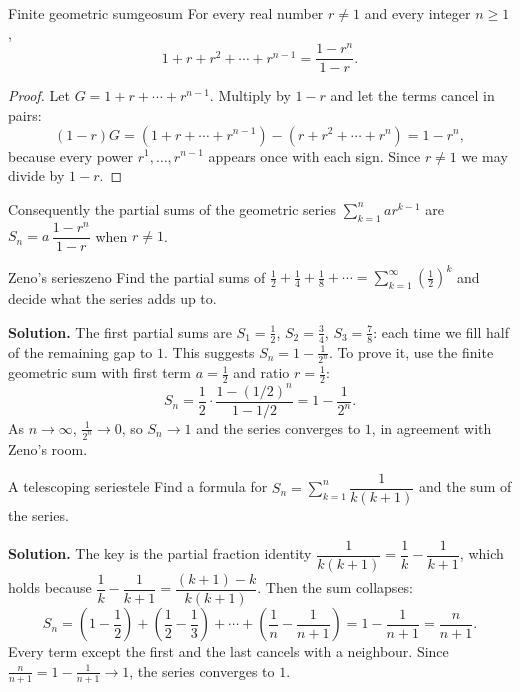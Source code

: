 \documentclass[11pt]{article}
\begin{document}
\begin{thm}{Finite geometric sum}{geosum}
For every real number $r\ne1$ and every integer $n\ge1$,
\[
1+r+r^2+\cdots+r^{n-1}=\frac{1-r^n}{1-r}.
\]
\end{thm}
\begin{proof}
Let $G=1+r+\cdots+r^{n-1}$. Multiply by $1-r$ and let the terms cancel in pairs:
\[
(1-r)G=(1+r+\cdots+r^{n-1})-(r+r^2+\cdots+r^{n})=1-r^n ,
\]
because every power $r^1,\dots,r^{n-1}$ appears once with each sign. Since $r\ne1$ we may divide by $1-r$.
\end{proof}

Consequently the partial sums of the geometric series $\sum_{k=1}^n a r^{k-1}$ are $S_n=a\,\dfrac{1-r^n}{1-r}$ when $r\ne1$.

\begin{exmp}{Zeno's series}{zeno}
Find the partial sums of $\frac12+\frac14+\frac18+\cdots=\sum_{k=1}^\infty\left(\frac12\right)^k$ and decide what the series adds up to.

\textbf{Solution.} The first partial sums are $S_1=\frac12$, $S_2=\frac34$, $S_3=\frac78$: each time we fill half of the remaining gap to $1$. This suggests $S_n=1-\frac1{2^n}$. To prove it, use the finite geometric sum with first term $a=\frac12$ and ratio $r=\frac12$:
\[
S_n=\frac12\cdot\frac{1-(1/2)^n}{1-1/2}=1-\frac1{2^n}.
\]
As $n\to\infty$, $\frac1{2^n}\to0$, so $S_n\to1$ and the series converges to $1$, in agreement with Zeno's room.
\end{exmp}

\begin{exmp}{A telescoping series}{tele}
Find a formula for $S_n=\sum_{k=1}^{n}\dfrac1{k(k+1)}$ and the sum of the series.

\textbf{Solution.} The key is the partial fraction identity $\dfrac1{k(k+1)}=\dfrac1k-\dfrac1{k+1}$, which holds because $\dfrac1k-\dfrac1{k+1}=\dfrac{(k+1)-k}{k(k+1)}$. Then the sum collapses:
\[
S_n=\left(1-\frac12\right)+\left(\frac12-\frac13\right)+\cdots+\left(\frac1n-\frac1{n+1}\right)=1-\frac1{n+1}=\frac n{n+1}.
\]
Every term except the first and the last cancels with a neighbour. Since $\frac n{n+1}=1-\frac1{n+1}\to1$, the series converges to $1$.
\end{exmp}
\end{document}

